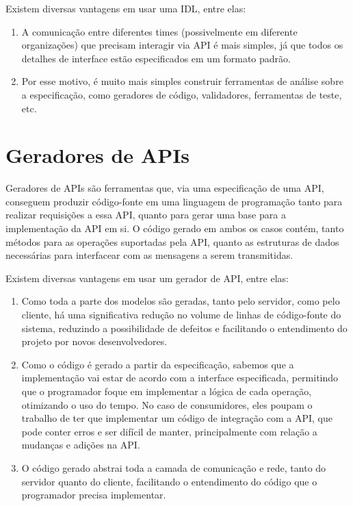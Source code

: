 Existem diversas vantagens em usar uma IDL, entre elas:

\begin{enumerate}
\item
  A comunicação entre diferentes times (possivelmente em diferente organizações) que
  precisam interagir via API é mais simples, já que todos os detalhes de interface
  estão especificados em um formato padrão.
\item
  Por esse motivo, é muito mais simples construir ferramentas de análise sobre a
  especificação, como geradores de código, validadores, ferramentas de teste, etc.
\end{enumerate}

\section{Geradores de APIs}

Geradores de APIs são ferramentas que, via uma especificação de uma API, conseguem
produzir código-fonte em uma linguagem de programação tanto para realizar requisições
a essa API, quanto para gerar uma base para a implementação da API em si.
O código gerado em ambos os casos contém, tanto métodos para as operações suportadas
pela API, quanto as estruturas de dados necessárias para interfacear com as mensagens
a serem transmitidas.

Existem diversas vantagens em usar um gerador de API, entre elas:

\begin{enumerate}
\item
  Como toda a parte dos modelos são geradas, tanto pelo servidor, como pelo cliente,
  há uma significativa redução no volume de linhas de código-fonte do sistema, reduzindo
  a possibilidade de defeitos \cite{5010260} e facilitando o entendimento do projeto por
  novos desenvolvedores.
\item
  Como o código é gerado a partir da especificação, sabemos que a implementação
  vai estar de acordo com a interface especificada, permitindo que o programador
  foque em implementar a lógica de cada operação, otimizando o uso do tempo. No
  caso de consumidores, eles poupam o trabalho de ter que implementar um código
  de integração com a API, que pode conter erros e ser difícil de manter,
  principalmente com relação a mudanças e adições na API.
\item
  O código gerado abstrai toda a camada de comunicação e rede, tanto do servidor
  quanto do cliente, facilitando o entendimento do código que o programador precisa
  implementar.
\end{enumerate}

